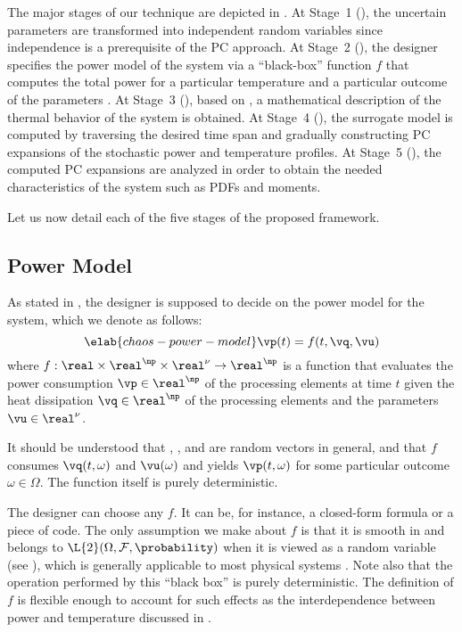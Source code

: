 The major stages of our technique are depicted in . At
Stage~1 (), the uncertain parameters \vu
are transformed into independent random variables \vz since independence is a
prerequisite of the \ac{PC} approach. At Stage~2 (), the
designer specifies the power model of the system via a ``black-box'' function
$f$ that computes the total power \vp for a particular temperature \vq and a
particular outcome of the parameters \vu. At Stage~3
(), based on , a
mathematical description of the thermal behavior of the system is obtained. At
Stage~4 (), the surrogate model is computed by
traversing the desired time span and gradually constructing \ac{PC} expansions
of the stochastic power and temperature profiles. At Stage~5
(), the computed \ac{PC} expansions are analyzed in
order to obtain the needed characteristics of the system such as \acp{PDF} and
moments.

Let us now detail each of the five stages of the proposed framework.

\subsection{Power Model}

As stated in , the designer is supposed to decide on the
power model for the system, which we denote as follows:
\begin{equation} \elab{chaos-power-model}
  \vp(t) = f(t, \vq, \vu)
\end{equation}
where $f: \real \times \real^\np \times \real^\nu \to \real^\np$ is a function
that evaluates the power consumption $\vp \in \real^\np$ of the processing
elements at time $t$ given the heat dissipation $\vq \in \real^\np$ of the
processing elements and the parameters $\vu \in \real^\nu$.

\begin{remark}
It should be understood that \vp, \vq, and \vu are random vectors in general,
and that $f$ consumes $\vq(t, \omega)$ and $\vu(\omega)$ and yields $\vp(t,
\omega)$ for some particular outcome $\omega \in \Omega$. The function itself is
purely deterministic.
\end{remark}

The designer can choose any $f$. It can be, for instance, a closed-form formula
or a piece of code. The only assumption we make about $f$ is that it is smooth
in \vz and belongs to $\L{2}(\Omega, \mathcal{F}, \probability)$ when it is
viewed as a random variable (see ), which is generally
applicable to most physical systems \cite{xiu2010}. Note also that the operation
performed by this ``black box'' is purely deterministic. The definition of $f$
is flexible enough to account for such effects as the interdependence between
power and temperature discussed in .

